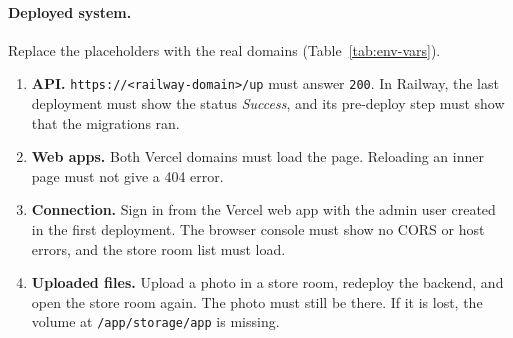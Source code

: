 \paragraph{Deployed system.}
Replace the placeholders with the real domains (Table~\ref{tab:env-vars}).
\begin{enumerate}[nosep]
  \item \textbf{API.}
        \texttt{https://}\allowbreak\texttt{<railway-domain>/up} must answer \texttt{200}.
        In Railway, the last deployment must show the status \textit{Success}, and its pre-deploy step must show that the migrations ran.
  \item \textbf{Web apps.}
        Both Vercel domains must load the page.
        Reloading an inner page must not give a 404 error.
  \item \textbf{Connection.}
        Sign in from the Vercel web app with the admin user created in the first deployment.
        The browser console must show no CORS or host errors, and the store room list must load.
  \item \textbf{Uploaded files.}
        Upload a photo in a store room, redeploy the backend, and open the store room again.
        The photo must still be there.
        If it is lost, the volume at \texttt{/app/storage/app} is missing.
\end{enumerate}
